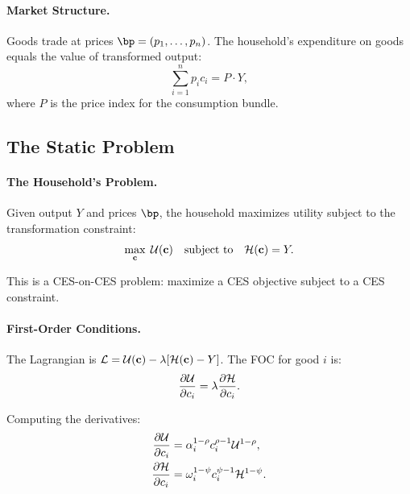 \paragraph{Market Structure.}
Goods trade at prices $\bp = (p_1, \ldots, p_n)$. The household's expenditure on goods equals the value of transformed output:
\begin{equation}
\sum_{i=1}^{n} p_i c_i = P \cdot Y,
\label{eq:ac-iso-budget}
\end{equation}
where $P$ is the price index for the consumption bundle.

\subsection{The Static Problem}
\label{subsec:ac-iso-static}

\paragraph{The Household's Problem.}
Given output $Y$ and prices $\bp$, the household maximizes utility subject to the transformation constraint:
\begin{equation}
\max_{\mathbf{c}} \; \mathcal{U}(\mathbf{c}) \quad \text{subject to} \quad \mathcal{H}(\mathbf{c}) = Y.
\label{eq:ac-iso-problem}
\end{equation}

This is a CES-on-CES problem: maximize a CES objective subject to a CES constraint.

\paragraph{First-Order Conditions.}
The Lagrangian is $\mathcal{L} = \mathcal{U}(\mathbf{c}) - \lambda[\mathcal{H}(\mathbf{c}) - Y]$. The FOC for good $i$ is:
\begin{equation}
\frac{\partial \mathcal{U}}{\partial c_i} = \lambda \frac{\partial \mathcal{H}}{\partial c_i}.
\label{eq:ac-iso-foc}
\end{equation}

Computing the derivatives:
\begin{align}
\frac{\partial \mathcal{U}}{\partial c_i} &= \alpha_i^{1-\rho} c_i^{\rho-1} \mathcal{U}^{1-\rho}, \\
\frac{\partial \mathcal{H}}{\partial c_i} &= \omega_i^{1-\psi} c_i^{\psi-1} \mathcal{H}^{1-\psi}.
\end{align}

